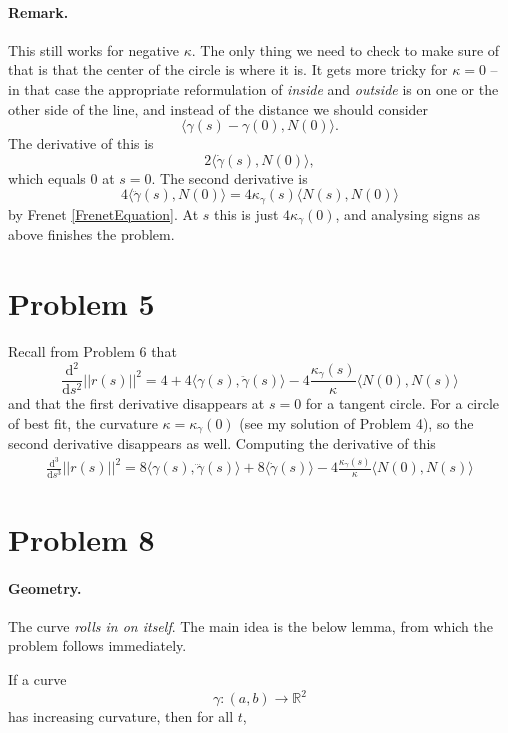 \paragraph{Remark.} This still works for negative \( \kappa \). The only thing we need to check to make sure of that is that the center of the circle is where it is. It gets more tricky for \(\kappa = 0 \) -- in that case the appropriate reformulation of \emph{inside} and \emph{outside} is on one or the other side of the line, and instead of the distance we should consider
\[
\langle \gamma(s) - \gamma(0), N(0) \rangle.
\]
The derivative of this is
\[
2\langle \dot\gamma(s), N(0) \rangle, 
\]
which equals \(0\) at \(s = 0\). The second derivative is
\[
4\langle \ddot \gamma(s), N(0) \rangle = 4\kappa_\gamma(s) \langle N(s), N(0) \rangle
\]
by Frenet \ref{FrenetEquation}. At \(s\) this is just \( 4\kappa_\gamma(0) \), and analysing signs as above finishes the problem.

\section{Problem 5}

Recall from Problem 6 that
\[
    \frac{\mathrm{d^2}}{\mathrm{d}s^2} \lvert \lvert r(s) \rvert \rvert^2 =  4 + 4\langle \gamma(s), \ddot\gamma(s) \rangle - 4\frac{\kappa_\gamma(s)}{\kappa}\langle N(0), N(s) \rangle
\]
and that the first derivative disappears at \( s = 0 \) for a tangent circle. For a circle of best fit, the curvature \( \kappa = \kappa_\gamma(0) \) (see my solution of Problem 4), so the second derivative disappears as well.
Computing the derivative of this
\begin{align*}
    \frac{\mathrm{d^3}}{\mathrm{d}s^3} \lvert \lvert r(s) \rvert \rvert^2 =  8\langle \gamma(s), \dddot\gamma(s) \rangle + 8\langle \dot\gamma(s) \rangle - 4\frac{\kappa_\gamma(s)}{\kappa}\langle N(0), N(s) \rangle
\end{align*}

\section{Problem 8}

\paragraph{Geometry.} The curve \emph{rolls in on itself}.
The main idea is the below lemma, from which the problem follows immediately.
\begin{lemma}\label{IncreasingCurvatureInsideCircle}
    If a curve
    \[ \gamma: (a, b) \to \mathbb{R}^2 \]
    has increasing curvature, then for all \( t \), 
\end{lemma}
